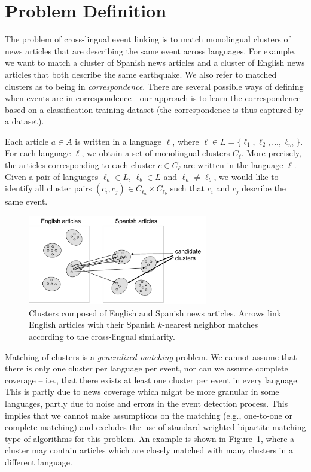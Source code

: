 \section{Problem Definition}

The problem of cross-lingual event linking is to match monolingual clusters of news articles
that are describing the same event across languages. For example, we want to match a cluster of
Spanish news articles and a cluster of English news articles that both describe the same earthquake.
We also refer to matched clusters as to being in \emph{correspondence}. There are several
possible ways of defining when events are in correspondence - our approach is to learn the correspondence
based on a classification training dataset (the correspondence is thus captured by a dataset).

Each article $a \in A$ is written in a language $\ell$, where $\ell \in L = \{\ell_1,\ell_2,...,\ell_m\}$.
For each language $\ell$, we obtain a set of monolingual clusters $C_{\ell}$. More precisely,
the articles corresponding to each cluster $c \in C_{\ell}$ are written in the language $\ell$.
Given a pair of languages $\ell_a \in L$, $\ell_b \in L$ and $\ell_a \not= \ell_b$, we would like
to identify all cluster pairs $(c_i, c_j) \in C_{\ell_a} \times C_{\ell_b}$ such that $c_i$ and $c_j$ describe the same event.

\begin{figure}[tb]
\centering
\includegraphics[width=0.7\textwidth]{figures/clusters.pdf}
\caption[Cluster linking]{Clusters composed of English and Spanish news articles. Arrows link English articles with their Spanish $k$-nearest neighbor matches according to the cross-lingual similarity.}
\label{fig:clusters}
\end{figure}

Matching of clusters is a \emph{generalized matching} problem. We cannot assume that there is only
one cluster per language per event, nor can we assume complete coverage -- i.e., that there exists
at least one cluster per event in every language. This is partly due to news coverage which might
be more granular in some languages, partly due to noise and errors in the event detection process. This
implies that we cannot make assumptions on the matching (e.g., one-to-one or complete matching) and excludes
the use of standard weighted bipartite matching type of algorithms for this problem. An example is shown in
Figure~\ref{fig:clusters}, where a cluster may contain articles which are closely matched with many clusters in a different language.

